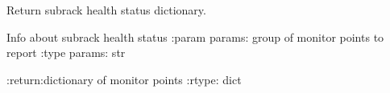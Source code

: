 \documentclass[letterpaper,10pt,english]{sphinxmanual}
\begin{document}
\begin{fulllineitems}
\label{\detokenize{webserverdocs:subrack_hardware.GetHealthDict}}
\pysigstartsignatures
{}
\pysigstopsignatures
\sphinxAtStartPar
Return subrack health status dictionary.

\begin{fulllineitems}
\label{\detokenize{webserverdocs:subrack_hardware.GetHealthDict.do}}
\pysigstartsignatures
{}
\pysigstopsignatures
\sphinxAtStartPar
Info about subrack health status
:param params: group of monitor points to report
:type params: str

\sphinxAtStartPar
:return:dictionary  of monitor points
:rtype: dict

\end{fulllineitems}


\end{fulllineitems}

\end{document}
